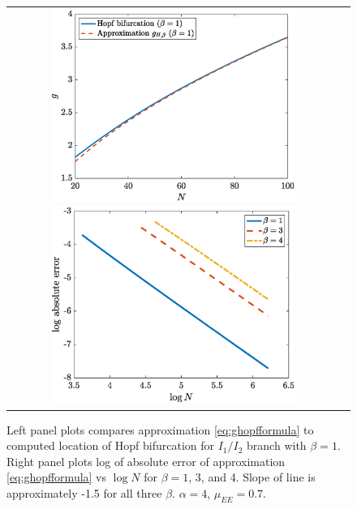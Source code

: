 \documentclass[11pt,reqno]{amsart}
\begin{document}
\begin{figure}
    \centering
    \begin{tabular}{cc}
    \includegraphics[width=8cm]{images/Hopfapproxbeta1.eps}
    \includegraphics[width=8cm]{images/Hopfapproxerror.eps}
    \end{tabular}
    \caption{Left panel plots compares approximation \cref{eq:ghopfformula} to computed location of Hopf bifurcation for $I_1/I_2$ branch with $\beta = 1$. Right panel plots log of absolute error of approximation \cref{eq:ghopfformula} vs $\log N$ for $\beta = 1$, 3, and 4. Slope of line is approximately -1.5 for all three $\beta$. $\alpha = 4$, $\mu_{EE}= 0.7$. }
    \label{fig:Hopferror}
\end{figure}
\end{document}
